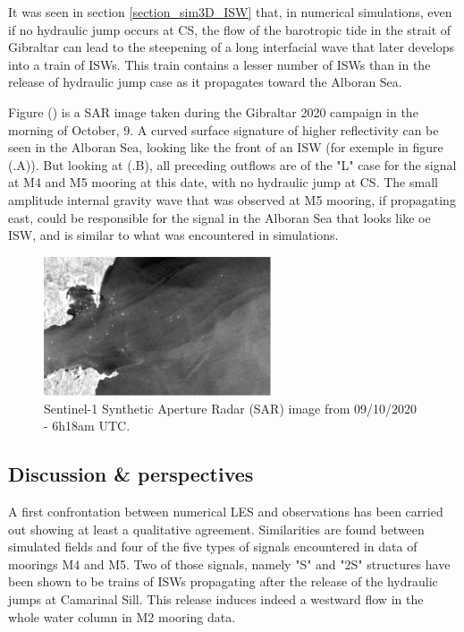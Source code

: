 It was seen in section \ref{section_sim3D_ISW} that, in numerical simulations, even if no hydraulic jump occurs at CS, the flow of the barotropic tide in the strait of Gibraltar can lead to the steepening of a long interfacial wave that later develops into a train of ISWs. This train contains a lesser number of ISWs than in the release of hydraulic jump case as it propagates toward the Alboran Sea. 

Figure () is a SAR image taken during the Gibraltar 2020 campaign in the morning of October, 9. A curved surface signature of higher reflectivity can be seen in the Alboran Sea, looking like the front of an ISW (for exemple in figure (.A)). But looking at (.B), all preceding outflows are of the "L" case for the signal at M4 and M5 mooring at this date, with no hydraulic jump at CS. The small amplitude internal gravity wave that was observed at M5 mooring, if propagating east, could be responsible for the signal in the Alboran Sea that looks like oe ISW, and is similar to what was encountered in simulations.

\begin{figure}[!h]
 \centering
 \includegraphics[width=0.6\textwidth]{./GBR3D/SAR_OBS_GEPETO.png}
 \caption [Sentinel-1 SAR image.]{Sentinel-1 Synthetic Aperture Radar (SAR) image from 09/10/2020 - 6h18am UTC.}
 \label{fig_SAROBS}
\end{figure}


\subsection{Discussion \& perspectives}

A first confrontation between numerical LES and observations has been carried out showing at least a qualitative agreement. Similarities are found between simulated fields and four of the five types of signals encountered in data of moorings M4 and M5. Two of those signals, namely "S" and "2S" structures have been shown to be trains of ISWs propagating after the release of the hydraulic jumps at Camarinal Sill. This release induces indeed a westward flow in the whole water column in M2 mooring data. 

